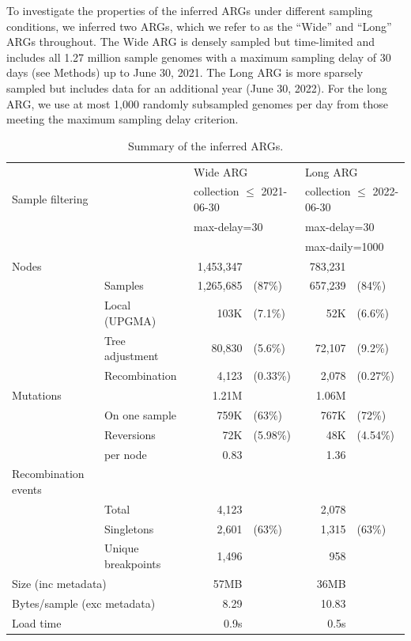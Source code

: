 \documentclass{article}
\begin{document}
To investigate the properties of the inferred ARGs under different
sampling conditions, we inferred two ARGs, which we refer to as the
``Wide'' and ``Long'' ARGs throughout.
The Wide ARG is densely sampled but time-limited and
includes all 1.27 million sample genomes  with a
maximum sampling delay of 30 days (see Methods) up to June 30, 2021.
The Long ARG is more sparsely sampled but
includes data for an additional year (June 30, 2022).
For the long ARG, we use at most 1,000 randomly subsampled
genomes per day from those meeting the maximum sampling delay criterion.

\begin{table}
\begin{center}
    \begin{tabular}{llrlrl}\toprule
        &  & \multicolumn{2}{l}{Wide ARG} & \multicolumn{2}{l}{Long ARG} \\
    \cmidrule{3-6}
    \multicolumn{2}{l}{Sample filtering}
             & \multicolumn{2}{l}{collection $\leq$ 2021-06-30}
                 & \multicolumn{2}{l}{collection $\leq$ 2022-06-30} \\
           & & \multicolumn{2}{l}{max-delay=30} & \multicolumn{2}{l}{max-delay=30} \\
        &  & &                               & \multicolumn{2}{l}{max-daily=1000} \\
    \midrule

    Nodes & & 1,453,347 & & 783,231  & \\
    & Samples & 1,265,685 & (87\%) & 657,239 & (84\%) \\
    & Local (UPGMA) & 103K & (7.1\%) & 52K & (6.6\%)  \\
    & Tree adjustment & 80,830 & (5.6\%) & 72,107 & (9.2\%) \\
    & Recombination & 4,123 & (0.33\%) & 2,078 & (0.27\%) \\
    \cmidrule{2-6}
    Mutations & & 1.21M &  & 1.06M & \\
    & On one sample & 759K & (63\%) & 767K & (72\%) \\
    & Reversions & 72K & (5.98\%) & 48K & (4.54\%) \\
    & per node & 0.83  &   & 1.36 \\
    \cmidrule{2-6}
    Recombination events & \\
    & Total & 4,123 & & 2,078 & \\
    & Singletons & 2,601  & (63\%) & 1,315 & (63\%) \\
    & Unique breakpoints & 1,496 &  & 958 & \\
    \cmidrule{2-6}
    \multicolumn{2}{l}{Size (inc metadata)} & 57MB & & 36MB&  \\
    \multicolumn{2}{l}{Bytes/sample (exc metadata)}  & 8.29  & & 10.83 \\
    Load time & & 0.9s & & 0.5s & \\
    \bottomrule
\end{tabular}
\end{center}

\caption{\label{tab:args}Summary of the inferred ARGs.
}
\end{table}
\end{document}

